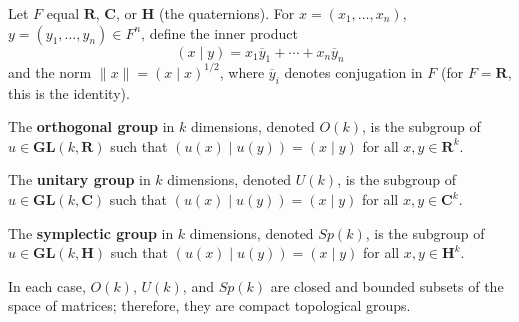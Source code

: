Let $F$ equal $\mathbf{R}$, $\mathbf{C}$, or $\mathbf{H}$ (the quaternions). For $x = (x_1, \ldots, x_n)$, $y = (y_1, \ldots, y_n) \in F^n$, define the inner product
$$(x \mid y) = x_1 \overline{y}_1 + \cdots + x_n \overline{y}_n$$
and the norm $\|x\| = (x \mid x)^{1/2}$, where $\overline{y}_i$ denotes conjugation in $F$ (for $F = \mathbf{R}$, this is the identity).

The \textbf{orthogonal group} in $k$ dimensions, denoted $O(k)$, is the subgroup of $u \in \mathbf{GL}(k, \mathbf{R})$ such that $(u(x) \mid u(y)) = (x \mid y)$ for all $x, y \in \mathbf{R}^k$.

The \textbf{unitary group} in $k$ dimensions, denoted $U(k)$, is the subgroup of $u \in \mathbf{GL}(k, \mathbf{C})$ such that $(u(x) \mid u(y)) = (x \mid y)$ for all $x, y \in \mathbf{C}^k$.

The \textbf{symplectic group} in $k$ dimensions, denoted $Sp(k)$, is the subgroup of $u \in \mathbf{GL}(k, \mathbf{H})$ such that $(u(x) \mid u(y)) = (x \mid y)$ for all $x, y \in \mathbf{H}^k$.

In each case, $O(k)$, $U(k)$, and $Sp(k)$ are closed and bounded subsets of the space of matrices; therefore, they are compact topological groups.
